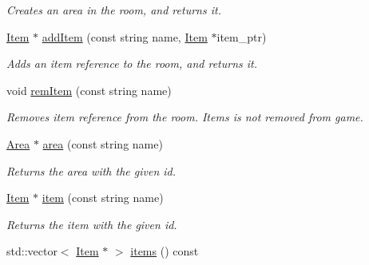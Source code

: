 \begin{DoxyCompactItemize}
\begin{DoxyCompactList}\small\item\em Creates an area in the room, and returns it. \item\end{DoxyCompactList}\item 
\hypertarget{classRoom_afc4236de7f6d8407c2e19219833816b9}{
\hyperlink{classItem}{Item} $\ast$ \hyperlink{classRoom_afc4236de7f6d8407c2e19219833816b9}{addItem} (const string name, \hyperlink{classItem}{Item} $\ast$item\_\-ptr)}
\label{classRoom_afc4236de7f6d8407c2e19219833816b9}

\begin{DoxyCompactList}\small\item\em Adds an item reference to the room, and returns it. \item\end{DoxyCompactList}\item 
\hypertarget{classRoom_a54d0fce03750d4c2b346d79d6d5595cf}{
void \hyperlink{classRoom_a54d0fce03750d4c2b346d79d6d5595cf}{remItem} (const string name)}
\label{classRoom_a54d0fce03750d4c2b346d79d6d5595cf}

\begin{DoxyCompactList}\small\item\em Removes item reference from the room. Items is not removed from game. \item\end{DoxyCompactList}\item 
\hypertarget{classRoom_a1e65595c34250315ed3f439b5868a2ca}{
\hyperlink{classArea}{Area} $\ast$ \hyperlink{classRoom_a1e65595c34250315ed3f439b5868a2ca}{area} (const string name)}
\label{classRoom_a1e65595c34250315ed3f439b5868a2ca}

\begin{DoxyCompactList}\small\item\em Returns the area with the given id. \item\end{DoxyCompactList}\item 
\hypertarget{classRoom_adf419b9c7937f0ce076676d1e499da51}{
\hyperlink{classItem}{Item} $\ast$ \hyperlink{classRoom_adf419b9c7937f0ce076676d1e499da51}{item} (const string name)}
\label{classRoom_adf419b9c7937f0ce076676d1e499da51}

\begin{DoxyCompactList}\small\item\em Returns the item with the given id. \item\end{DoxyCompactList}\item 
\hypertarget{classRoom_ac219847cf106a7463ac0ce7350b7f9a4}{
std::vector$<$ \hyperlink{classItem}{Item} $\ast$ $>$ \hyperlink{classRoom_ac219847cf106a7463ac0ce7350b7f9a4}{items} () const }
\label{classRoom_ac219847cf106a7463ac0ce7350b7f9a4}


\end{DoxyCompactItemize}
